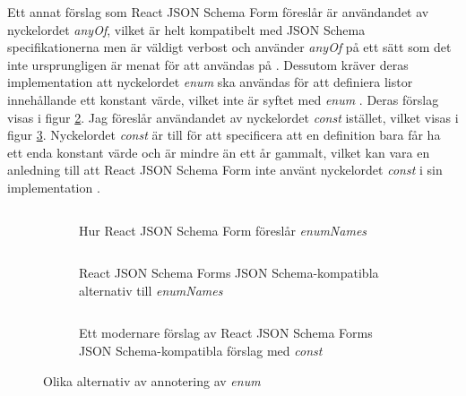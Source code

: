 Ett annat förslag som React JSON Schema Form föreslår är användandet av nyckelordet \textit{anyOf}, vilket är helt kompatibelt med JSON Schema specifikationerna men är väldigt verbost och använder \textit{anyOf} på ett sätt som det inte ursprungligen är menat för att användas på \cite{MozillaServices, Andrews2018}. Dessutom kräver deras implementation att nyckelordet \textit{enum} ska användas för att definiera listor innehållande ett konstant värde, vilket inte är syftet med \textit{enum} \cite[s.~9]{Andrews2018}. Deras förslag visas i figur \ref{fig:enum-example:any-of}. Jag föreslår användandet av nyckelordet \textit{const} istället, vilket visas i figur \ref{fig:enum-example:any-of-const}. Nyckelordet \textit{const} är till för att specificera att en definition bara får ha ett enda konstant värde och är mindre än ett år gammalt, vilket kan vara en anledning till att React JSON Schema Form inte använt nyckelordet \textit{const} i sin implementation \cite[s.~9]{Andrews2018}.

\begin{figure}
	\begin{subfigure}[t]{\textwidth}
		\inputminted[tabsize=2, frame=single, fontsize=\small, framesep=2mm, breaklines]{json}{code/enum-example/extra-array.json}
		\vspace{-1.2em}
		\caption{Hur React JSON Schema Form föreslår \textit{enumNames} \cite{MozillaServices}}
		\label{fig:enum-example:extra-array}
		\vspace{.8em}
	\end{subfigure}
	\begin{subfigure}[t]{0.47\textwidth}
		\inputminted[tabsize=2, frame=single, fontsize=\small, framesep=2mm, breaklines]{json}{code/enum-example/any-of.json}
		\vspace{-1.2em}
		\caption{React JSON Schema Forms JSON Schema-kompatibla alternativ till \textit{enumNames} \cite{MozillaServices}}
		\label{fig:enum-example:any-of}
	\end{subfigure}\hfill
	\begin{subfigure}[t]{0.47\textwidth}
		\inputminted[tabsize=2, frame=single, fontsize=\small, framesep=2mm, breaklines]{json}{code/enum-example/any-of-const.json}
		\vspace{-1.2em}
		\caption{Ett modernare förslag av React JSON Schema Forms JSON Schema-kompatibla förslag med \textit{const}}
		\label{fig:enum-example:any-of-const}
	\end{subfigure}
	\caption{Olika alternativ av annotering av \textit{enum}}
	\label{fig:enum-example:any-of-examples}
\end{figure}

